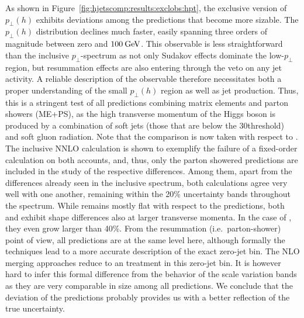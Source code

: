 As shown in Figure~\ref{fig:hjetscomp:results:exclobs:hpt}, the
exclusive version of $p_\perp(h)$ exhibits deviations among the
predictions that become more sizable. The $p_\perp(h)$ distribution 
declines much faster, easily spanning three orders of magnitude 
between zero and $100\text{\:GeV}$. This observable is less straightforward 
than the inclusive $p_\perp$-spectrum as not only Sudakov effects 
dominate the low-$p_\perp$ region, but resummation effects are also 
entering through the veto on any jet activity. A reliable description
of the observable therefore necessitates both a proper understanding
of the small $p_\perp(h)$ region as well as jet production. Thus,
this is a stringent test of all predictions combining matrix elements
and parton showers (ME+PS), as
the high transverse momentum of the Higgs boson is produced by a
combination of soft jets (those that are below the $30$\gev threshold)
and soft gluon radiation. Note that the comparison is now taken with respect to
\Powheg \NNLOPS. The inclusive 
NNLO calculation is shown to exemplify the failure of a fixed-order 
calculation on both accounts, and, thus, only the parton showered 
predictions are included in the study of the respective differences. 
Among them, apart from the differences already seen in the inclusive 
spectrum, both \NNLOPS calculations agree very well with one another, 
remaining within the 20\% uncertainty bands throughout the spectrum. 
While \Sherpa \MEPSatNLO remains mostly flat with respect to the \NNLOPS 
predictions, both \MGaMC and \Herwig exhibit shape differences also at
larger transverse momenta. In the case of \Herwig, they even grow
larger than 40\%. From the resummation (i.e.~parton-shower)
point of view, all predictions are at the same level here, although
formally the \NNLOPS techniques lead to a more accurate description of
the exact zero-jet bin. The NLO merging approaches reduce to an \NLOPS
treatment in this zero-jet bin. It is however hard to infer this
formal difference from the behavior of the scale variation bands as
they are very comparable in size among all predictions. We conclude
that the deviation of the predictions probably provides us with a
better reflection of the true uncertainty.

